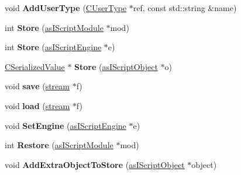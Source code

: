 \begin{DoxyCompactItemize}
\item 
\mbox{\label{class_c_serializer_ac620599decdaa3b922f04b3538c08531}} 
void {\bfseries Add\+User\+Type} (\hyperlink{struct_c_user_type}{C\+User\+Type} $\ast$ref, const std\+::string \&name)
\item 
\mbox{\label{class_c_serializer_a87bcb1fc2bd5d3b45001af791b0c5ad9}} 
int {\bfseries Store} (\hyperlink{classas_i_script_module}{as\+I\+Script\+Module} $\ast$mod)
\item 
\mbox{\label{class_c_serializer_a9e4f936137b26ce6a608feeb40555ac0}} 
int {\bfseries Store} (\hyperlink{classas_i_script_engine}{as\+I\+Script\+Engine} $\ast$e)
\item 
\mbox{\label{class_c_serializer_a2ddc4ea0bc7031fbd4f5f652cbb66d1c}} 
\hyperlink{class_c_serialized_value}{C\+Serialized\+Value} $\ast$ {\bfseries Store} (\hyperlink{classas_i_script_object}{as\+I\+Script\+Object} $\ast$o)
\item 
\mbox{\label{class_c_serializer_ab65b7dd83ba4e05b7245e04a722ae37e}} 
void {\bfseries save} (\hyperlink{structstream}{stream} $\ast$f)
\item 
\mbox{\label{class_c_serializer_a58ae613fedf2d9159e8181b3008ebddd}} 
void {\bfseries load} (\hyperlink{structstream}{stream} $\ast$f)
\item 
\mbox{\label{class_c_serializer_a65551e8c33595eeeda94437d74177672}} 
void {\bfseries Set\+Engine} (\hyperlink{classas_i_script_engine}{as\+I\+Script\+Engine} $\ast$e)
\item 
\mbox{\label{class_c_serializer_a5e8d6804389021c05cf3df968c1e15e5}} 
int {\bfseries Restore} (\hyperlink{classas_i_script_module}{as\+I\+Script\+Module} $\ast$mod)
\item 
\mbox{\label{class_c_serializer_a402c3558201bb7c6a677e4c5d52ec41e}} 
void {\bfseries Add\+Extra\+Object\+To\+Store} (\hyperlink{classas_i_script_object}{as\+I\+Script\+Object} $\ast$object)

\end{DoxyCompactItemize}

